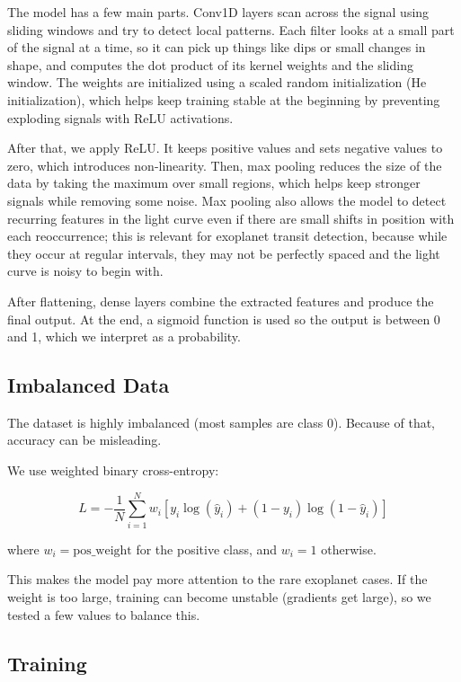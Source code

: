 \documentclass[conference]{IEEEtran}
\begin{document}
The model has a few main parts. Conv1D layers scan across the signal using sliding windows and try to detect local patterns. Each filter looks at a small part of the signal at a time, so it can pick up things like dips or small changes in shape, and computes the dot product of its kernel weights and the sliding window. The weights are initialized using a scaled random initialization (He initialization), which helps keep training stable at the beginning by preventing exploding signals with ReLU activations.

After that, we apply ReLU. It keeps positive values and sets negative values to zero, which introduces non-linearity. Then, max pooling reduces the size of the data by taking the maximum over small regions, which helps keep stronger signals while removing some noise. Max pooling also allows the model to detect recurring features in the light curve even if there are small shifts in position with each reoccurrence; this is relevant for exoplanet transit detection, because while they occur at regular intervals, they may not be perfectly spaced and the light curve is noisy to begin with.

After flattening, dense layers combine the extracted features and produce the final output. At the end, a sigmoid function is used so the output is between 0 and 1, which we interpret as a probability.

\subsection{Imbalanced Data}

The dataset is highly imbalanced (most samples are class 0). Because of that, accuracy can be misleading.

We use weighted binary cross-entropy:

\[
L = -\frac{1}{N} \sum_{i=1}^{N} w_i \left[ y_i \log(\hat{y}_i) + (1 - y_i)\log(1 - \hat{y}_i) \right]
\]

where $w_i = \text{pos\_weight}$ for the positive class, and $w_i = 1$ otherwise.

This makes the model pay more attention to the rare exoplanet cases. If the weight is too large, training can become unstable (gradients get large), so we tested a few values to balance this.

\subsection{Training}
\end{document}
